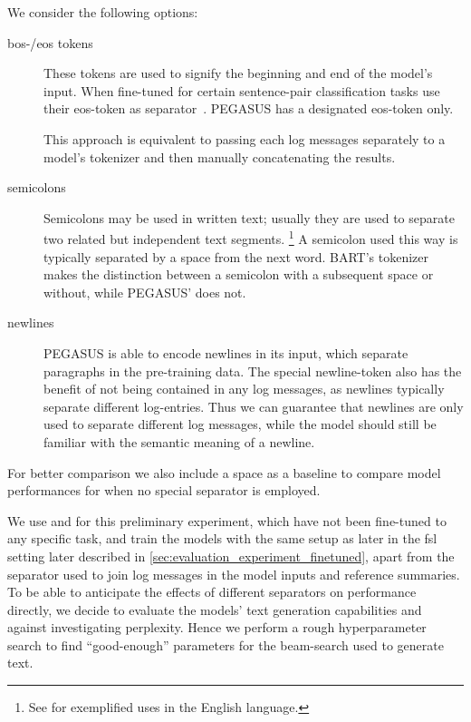 We consider the following options:
\begin{description}
\item[\acs{bos}-/\acs{eos} tokens] These tokens are used to signify the beginning and end of the model's input.
      When fine-tuned for certain sentence-pair classification tasks \citeauthor*{bart} use their \ac{eos}-token as separator~\parencite[7874]{bart}.
      PEGASUS has a designated \ac{eos}-token only.

      This approach is equivalent to passing each log messages separately to a model's tokenizer and then manually concatenating the results.
\item[semicolons] Semicolons may be used in written text; usually they are used to separate two related but independent text segments.%
      \footnote{See  for exemplified uses in the English language.}
      A semicolon used this way is typically separated by a space from the next word.
      BART's tokenizer makes the distinction between a semicolon with a subsequent space or without, while PEGASUS' does not.
\item[newlines] PEGASUS is able to encode newlines in its input,
      which separate paragraphs in the pre-training data.
      The special newline-token also has the benefit of not being contained in any log messages,
      as newlines typically separate different log-entries.
      Thus we can guarantee that newlines are only used to separate different log messages,
      while the model should still be familiar with the semantic meaning of a newline.
\end{description}
For better comparison we also include a space as a baseline to compare
model performances for when no special separator is employed.

We use  and  for this preliminary experiment,
which have not been fine-tuned to any specific task,
and train the models with the same setup as later in the \acs*{fsl} setting later described in \autoref{sec:evaluation_experiment_finetuned},
apart from the separator used to join log messages in the model inputs and reference summaries.
To be able to anticipate the effects of different separators on performance directly,
we decide to evaluate the models' text generation capabilities and against investigating perplexity.
Hence we perform a rough hyperparameter search to find \enquote{good-enough} parameters for the beam-search used to generate text.

